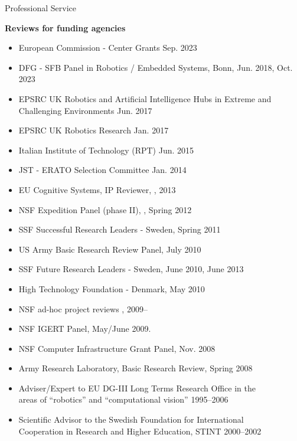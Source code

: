 \documentclass{article}
\begin{document}
\begin{cv}
\begin{cvlist}{Professional Service}
\item {\bf Reviews for funding agencies}
  \begin{itemize}
  \item European Commission - Center Grants \cftdotfill{\cftdotsep} Sep. 2023
  \item DFG - SFB Panel in Robotics / Embedded Systems,
    Bonn,\cftdotfill{\cftdotsep} Jun. 2018, Oct. 2023
  \item EPSRC UK Robotics and Artificial Intelligence Hubs in Extreme
    and Challenging Environments \cftdotfill{\cftdotsep} Jun. 2017
  \item EPSRC UK Robotics Research  \cftdotfill{\cftdotsep} Jan. 2017
  \item Italian Institute of Technology (RPT) \cftdotfill{\cftdotsep}
    Jun. 2015
 \item JST - ERATO Selection Committee \cftdotfill{\cftdotsep} Jan. 2014
 \item EU Cognitive Systems, IP Reviewer, \cftdotfill{\cftdotsep}, 2013
 \item NSF Expedition Panel (phase II), \cftdotfill{\cftdotsep},
   Spring 2012
 \item SSF Successful Research Leaders - Sweden,
   \cftdotfill{\cftdotsep} Spring 2011
 \item US Army Basic Research Review Panel, \cftdotfill{\cftdotsep} July 2010
 \item SSF Future Research Leaders - Sweden, \cftdotfill{\cftdotsep} June 2010, June 2013
 \item High Technology Foundation - Denmark, \cftdotfill{\cftdotsep}  May 2010
 \item NSF ad-hoc project reviews \cftdotfill{\cftdotsep}, 2009--
 \item NSF IGERT Panel, \cftdotfill{\cftdotsep} May/June 2009.
 \item NSF Computer Infrastructure Grant Panel,  \cftdotfill{\cftdotsep} Nov. 2008
 \item Army Research Laboratory, Basic Research Review, \cftdotfill{\cftdotsep}  Spring 2008
 \item Adviser/Expert to EU DG-III Long Terms Research Office in the\\
   areas of ``robotics'' and ``computational vision''
   \cftdotfill{\cftdotsep}  1995--2006
 \item Scientific Advisor to the Swedish Foundation for International\\
   Cooperation in Research and Higher Education,  STINT
   \cftdotfill{\cftdotsep}  2000--2002

\end{itemize}
\end{cvlist}
\end{cv}
\end{document}
